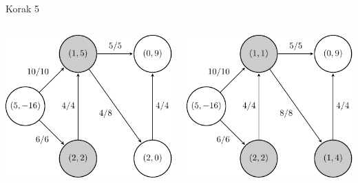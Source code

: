 \documentclass{beamer}
\begin{document}
\begin{frame}{Korak 5}
    \begin{columns}
        \begin{column}{0.5\textwidth}
            \centering
            \includegraphics[scale=0.7]{../writing/images/graf2-7.pdf}
        \end{column}

        \begin{column}{0.5\textwidth}
            \centering
            \includegraphics[scale=0.7]{../writing/images/graf2-6.pdf}
        \end{column}
    \end{columns}
\end{frame}
\end{document}
